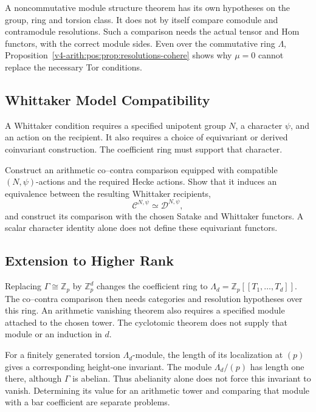 \begin{remark}
\label{v4-arith:pos:rem:non-commutative-form}
A noncommutative module structure theorem has its own hypotheses
on the group, ring and torsion class.
It does not by itself compare comodule and contramodule
resolutions. Such a comparison needs the actual tensor and
Hom functors, with the correct module sides.
Even over the commutative ring \(\Lambda\),
Proposition~\ref{v4-arith:pos:prop:resolutions-cohere}
shows why \(\mu=0\) cannot replace the necessary Tor conditions.
\end{remark}

\subsection{Whittaker Model Compatibility}
\label{v4-arith:pos:whittaker}

A Whittaker condition requires a specified unipotent group
\(N\), a character \(\psi\), and an action on the recipient.
It also requires a choice of equivariant or derived
coinvariant construction. The coefficient ring must support
that character.

\begin{question}
\label{v4-arith:pos:cj:whittaker-compat}
Construct an arithmetic co--contra comparison equipped with
compatible \((N,\psi)\)-actions and the required Hecke actions.
Show that it induces an equivalence between the resulting
Whittaker recipients,
\[
 \mathcal C^{N,\psi}\simeq\mathcal D^{N,\psi},
\]
and construct its comparison with the chosen Satake and
Whittaker functors. A scalar character identity alone does
not define these equivariant functors.
\end{question}

\subsection{Extension to Higher Rank}
\label{v4-arith:pos:higher-rank}

Replacing \(\Gamma\cong\mathbb Z_p\) by \(\mathbb Z_p^d\)
changes the coefficient ring to
\(\Lambda_d=\mathbb Z_p[[T_1,\ldots,T_d]]\).
The co--contra comparison then needs categories and resolution
hypotheses over this ring. An arithmetic vanishing theorem also
requires a specified module attached to the chosen tower.
The cyclotomic theorem does not supply that module or an induction
in \(d\).

\begin{remark}
\label{v4-arith:pos:rem:higher-rank}
For a finitely generated torsion \(\Lambda_d\)-module, the
length of its localization at \((p)\) gives a corresponding
height-one invariant. The module \(\Lambda_d/(p)\) has length
one there, although \(\Gamma\) is abelian. Thus abelianity alone
does not force this invariant to vanish. Determining its value
for an arithmetic tower and comparing that module with a bar
coefficient are separate problems.
\end{remark}

